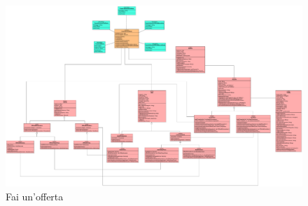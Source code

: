             \begin{figure}[htbp!]
                \centering
                    \includegraphics[width=1\linewidth]{Immagini/Diagrammi/Class Diagram/Venditore e compratore/FaiOfferta.pdf}
                \caption{Fai un'offerta}
            \end{figure}

    \clearpage
        
